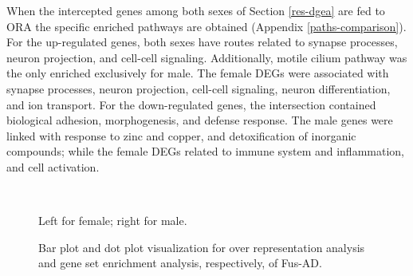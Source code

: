 When the intercepted genes among both sexes of Section \ref{res-dgea} are fed to ORA the specific enriched pathways are obtained (Appendix \ref{paths-comparison}). For the up-regulated genes, both sexes have routes related to synapse processes, neuron projection, and cell-cell signaling. Additionally, motile cilium pathway was the only enriched exclusively for male. The female DEGs were associated with synapse processes, neuron projection, cell-cell signaling, neuron differentiation, and ion transport. For the down-regulated genes, the intersection contained biological adhesion, morphogenesis, and defense response. The male genes were linked with response to zinc and copper, and detoxification of inorganic compounds; while the female DEGs related to immune system and inflammation, and cell activation.

\begin{figure}[!ht]%
    \centering
    \qquad
    \\
    \qquad
\caption{Bar plot and dot plot visualization for over representation analysis and gene set enrichment analysis, respectively, of Fus-AD.}
\footnotesize Left for female; right for male.
\label{fig:path-fus-ad}%
\end{figure}

